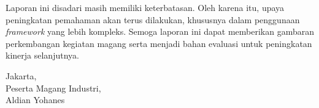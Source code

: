 \begin{singlespace}
      Laporan ini disadari masih memiliki keterbatasan. Oleh karena itu, upaya
      peningkatan pemahaman akan terus dilakukan, khususnya dalam penggunaan
      \textit{framework} yang lebih kompleks. Semoga laporan ini dapat memberikan
      gambaran perkembangan kegiatan magang serta menjadi bahan evaluasi untuk
      peningkatan kinerja selanjutnya.

      \begin{flushright}
            Jakarta, \signaturedate\\
            Peserta Magang Industri,\\[2cm]
            Aldian Yohanes\\
      \end{flushright}
\end{singlespace}